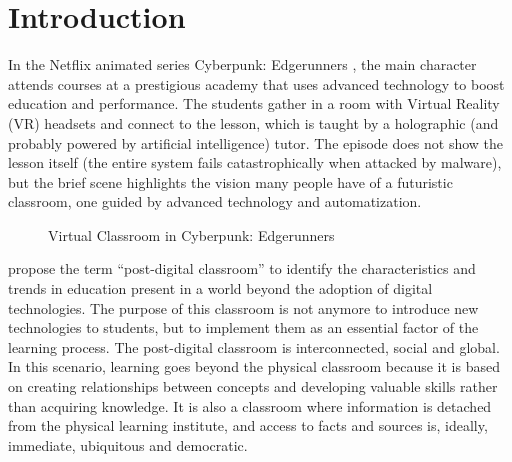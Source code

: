 
\chapter{Introduction}

In the Netflix animated series Cyberpunk: Edgerunners \parencite{cyberpunk_2022}, the main character attends courses at a 
prestigious academy that uses advanced technology to boost education and performance. The students gather in a room with
Virtual Reality (VR) headsets and connect to the lesson, which is taught by a holographic (and probably powered by artificial
intelligence) tutor. The episode does not show the lesson itself (the entire system fails catastrophically when attacked by
malware), but the brief scene highlights the vision many people have of a futuristic classroom, one guided by advanced technology
and automatization.

\begin{figure}[t]
    \caption{Virtual Classroom in Cyberpunk: Edgerunners\label{fig:1-1}}
\end{figure}

\textcite{forsler_2024} propose the term “post-digital classroom” to identify the characteristics and trends in education
present in a world beyond the adoption of digital technologies. The purpose of this classroom is not anymore to
introduce new technologies to students, but to implement them as an essential factor of the learning process. The
post-digital classroom is interconnected, social and global. In this scenario, learning goes beyond the physical
classroom because it is based on creating relationships between concepts and developing valuable skills rather than
acquiring knowledge. It is also a classroom where information is detached from the physical learning institute, and
access to facts and sources is, ideally, immediate, ubiquitous and democratic.

